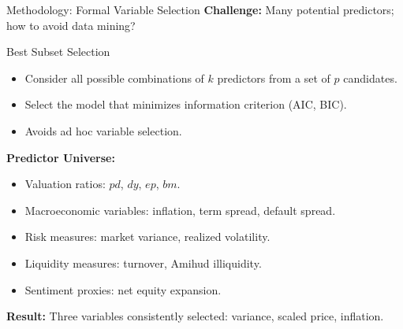 \documentclass{beamer}
\begin{document}
\begin{frame}{Methodology: Formal Variable Selection}
    \textbf{Challenge:} Many potential predictors; how to avoid data mining?
    
    \begin{block}{Best Subset Selection}
        \begin{itemize}
            \item Consider all possible combinations of $k$ predictors from a set of $p$ candidates.
            \item Select the model that minimizes information criterion (AIC, BIC).
            \item Avoids ad hoc variable selection.
        \end{itemize}
    \end{block}
    
    \textbf{Predictor Universe:}
    \begin{itemize}
        \item Valuation ratios: $pd$, $dy$, $ep$, $bm$.
        \item Macroeconomic variables: inflation, term spread, default spread.
        \item Risk measures: market variance, realized volatility.
        \item Liquidity measures: turnover, Amihud illiquidity.
        \item Sentiment proxies: net equity expansion.
    \end{itemize}
    
    \vspace{0.2cm}
    \textbf{Result:} Three variables consistently selected: variance, scaled price, inflation.
\end{frame}
\end{document}
